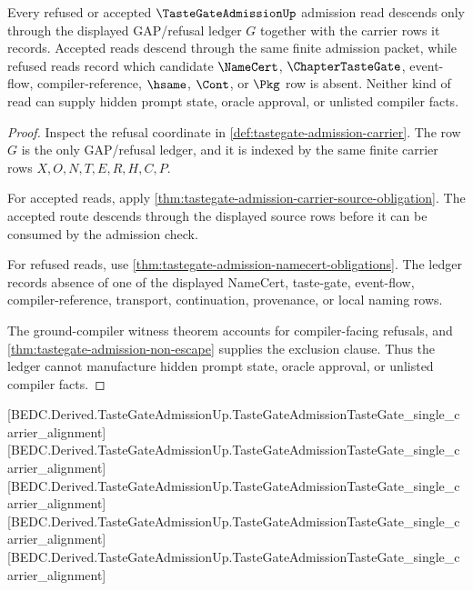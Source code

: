 \begin{theorem}
\label{thm:tastegate-admission-ledger-descent-obligation}
Every refused or accepted $\TasteGateAdmissionUp$ admission read descends only
through the displayed GAP/refusal ledger $G$ together with the carrier rows it
records. Accepted reads descend through the same finite admission packet, while
refused reads record which candidate $\NameCert$, $\ChapterTasteGate$,
event-flow, compiler-reference, $\hsame$, $\Cont$, or $\Pkg$ row is absent.
Neither kind of read can supply hidden prompt state, oracle approval, or
unlisted compiler facts.
\end{theorem}
\begin{proof}
Inspect the refusal coordinate in \autoref{def:tastegate-admission-carrier}.
The row $G$ is the only GAP/refusal ledger, and it is indexed by the same
finite carrier rows $X,O,N,T,E,R,H,C,P$.

For accepted reads, apply
\autoref{thm:tastegate-admission-carrier-source-obligation}. The accepted route
descends through the displayed source rows before it can be consumed by the
admission check.

For refused reads, use \autoref{thm:tastegate-admission-namecert-obligations}.
The ledger records absence of one of the displayed NameCert, taste-gate,
event-flow, compiler-reference, transport, continuation, provenance, or local
naming rows.

The ground-compiler witness theorem accounts for compiler-facing refusals, and
\autoref{thm:tastegate-admission-non-escape} supplies the exclusion clause. Thus
the ledger cannot manufacture hidden prompt state, oracle approval, or unlisted
compiler facts.
\end{proof}

[BEDC.Derived.TasteGateAdmissionUp.TasteGateAdmissionTasteGate\_single\_carrier\_alignment]
[BEDC.Derived.TasteGateAdmissionUp.TasteGateAdmissionTasteGate\_single\_carrier\_alignment]
[BEDC.Derived.TasteGateAdmissionUp.TasteGateAdmissionTasteGate\_single\_carrier\_alignment]
[BEDC.Derived.TasteGateAdmissionUp.TasteGateAdmissionTasteGate\_single\_carrier\_alignment]
[BEDC.Derived.TasteGateAdmissionUp.TasteGateAdmissionTasteGate\_single\_carrier\_alignment]


